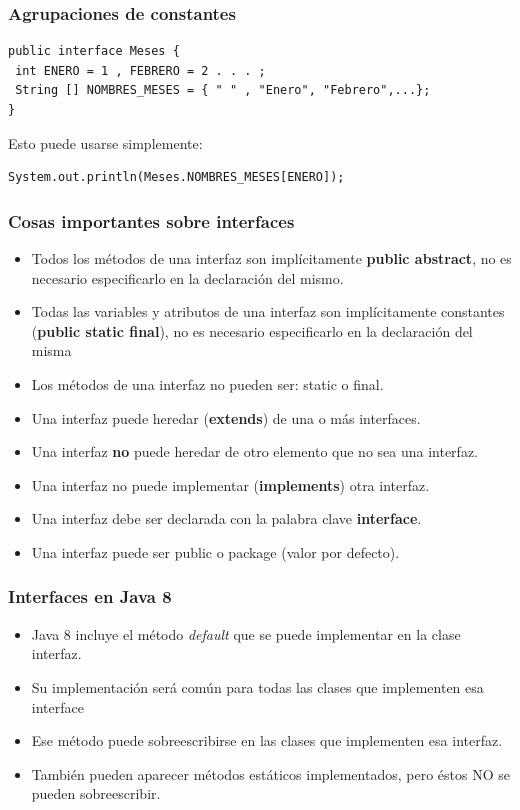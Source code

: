 \documentclass{beamer}
\begin{document}
\begin{frame}[fragile]
\frametitle{Agrupaciones de constantes}
{\color{yellow}
\begin{verbatim}
public interface Meses {
 int ENERO = 1 , FEBRERO = 2 . . . ;
 String [] NOMBRES_MESES = { " " , "Enero", "Febrero",...};
}
\end{verbatim}}
\pause
Esto puede usarse simplemente:
{\color{purple}
\begin{verbatim}
System.out.println(Meses.NOMBRES_MESES[ENERO]);
\end{verbatim}}
\end{frame}

\begin{frame}[fragile]
\frametitle{Cosas importantes sobre interfaces}
\begin{itemize}[<+->]
\item     Todos los métodos de una interfaz son implícitamente \textbf{public abstract}, no es necesario especificarlo en la declaración del mismo.
\item  Todas las variables y atributos de una interfaz son implícitamente constantes (\textbf{public static final}), no es necesario especificarlo en la declaración del misma
\item  Los métodos de una interfaz no pueden ser: static o final.
\item  Una interfaz puede heredar (\textbf{extends}) de una o más interfaces.
\item  Una interfaz \textbf{no} puede heredar de otro elemento que no sea una interfaz.
\item  Una interfaz no puede implementar (\textbf{implements}) otra interfaz.
\item  Una interfaz debe ser declarada con la palabra clave \textbf{interface}.
\item  Una interfaz puede ser public o package (valor por defecto). 
\end{itemize}

\end{frame}

\begin{frame}[fragile]
\frametitle{Interfaces en Java 8}
\begin{itemize}[<+->]
\item Java 8 incluye el método \emph{default} que se puede implementar en la clase interfaz. 
\item Su implementación será común para todas las clases que implementen esa interface
\item Ese método puede sobreescribirse en las clases que implementen esa interfaz.
\item También pueden aparecer métodos estáticos implementados, pero éstos NO se pueden sobreescribir.
\end{itemize}
\end{frame}
\end{document}
